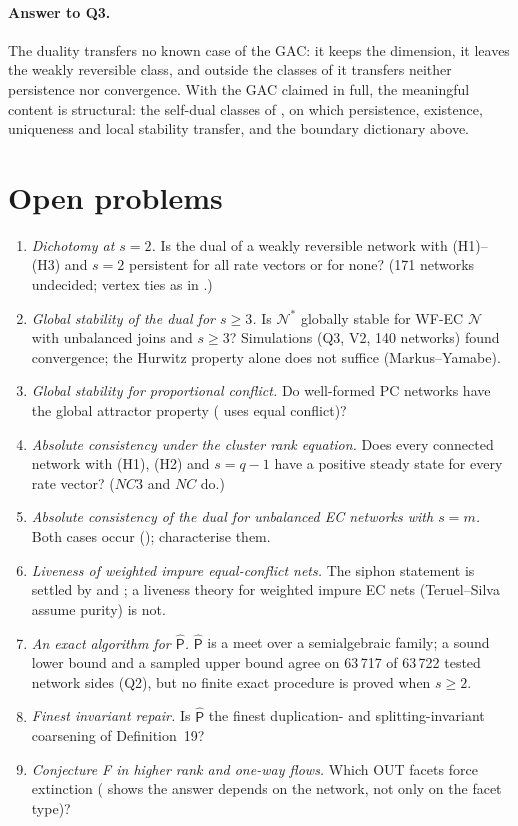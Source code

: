 \documentclass[11pt,a4paper]{report}
\newcommand{\Net}{\mathcal{N}}
\newcommand{\Nd}{\mathcal{N}^{*}}
\newcommand{\Ph}{\widehat{\mathsf{P}}}
\begin{document}
\paragraph{Answer to Q3.} The duality transfers no known case of the GAC: it keeps the dimension, it leaves the weakly
reversible class, and outside the classes of  it transfers neither persistence nor convergence. With the
GAC claimed in full, the meaningful content is structural: the self-dual classes of , on which
persistence, existence, uniqueness and local stability transfer, and the boundary dictionary above.

\section{Open problems}\label{sec:open}

\begin{enumerate}
\item \emph{Dichotomy at \(s=2\).} Is the dual of a weakly reversible network with (H1)--(H3) and \(s=2\) persistent for
all rate vectors or for none? (171 networks undecided; vertex ties as in .)
\item \emph{Global stability of the dual for \(s\ge3\).} Is \(\Nd\) globally stable for WF-EC \(\Net\) with unbalanced joins and
\(s\ge3\)? Simulations (Q3, V2, 140 networks) found convergence; the Hurwitz property alone does not suffice (Markus--Yamabe).
\item \emph{Global stability for proportional conflict.} Do well-formed PC networks have the global attractor property
( uses equal conflict)?
\item \emph{Absolute consistency under the cluster rank equation.} Does every connected network with (H1), (H2) and \(s=q-1\)
have a positive steady state for every rate vector? (\(NC3\) and \(NC\) do.)
\item \emph{Absolute consistency of the dual for unbalanced EC networks with \(s=m\).} Both cases occur ();
characterise them.
\item \emph{Liveness of weighted impure equal-conflict nets.} The siphon statement is settled by  and
; a liveness theory for weighted impure EC nets (Teruel--Silva assume purity) is not.
\item \emph{An exact algorithm for \(\Ph\).} \(\Ph\) is a meet over a semialgebraic family; a sound lower bound and a sampled
upper bound agree on 63\,717 of 63\,722 tested network sides (Q2), but no finite exact procedure is proved when \(s\ge2\).
\item \emph{Finest invariant repair.} Is \(\Ph\) the finest duplication- and splitting-invariant coarsening of Definition~19?
\item \emph{Conjecture F in higher rank and one-way flows.} Which OUT facets force extinction ( shows the answer
depends on the network, not only on the facet type)?
\end{enumerate}
\end{document}
